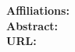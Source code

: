 \documentclass[a4paper,12pt]{article}
\begin{document}
{    \textbf{Affiliations:} %
                          \Affiliations \\

    \textbf{Abstract:} \Abstract \\

    \textbf{URL:} \href{\Linktotheabstract}{\Linktotheabstract} \\

    \newpage

}
\end{document}
